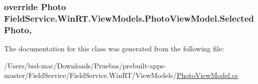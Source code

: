 \hypertarget{class_field_service_1_1_win_r_t_1_1_view_models_1_1_photo_view_model_a7da5a8139584ddbeadc08df3005b5a30}{
\subsubsection[{Selected\+Photo}]{\setlength{\rightskip}{0pt plus 5cm}override {\bf Photo} Field\+Service.\+Win\+R\+T.\+View\+Models.\+Photo\+View\+Model.\+Selected\+Photo\hspace{0.3cm}{\ttfamily [get]}, {\ttfamily [set]}}}\label{class_field_service_1_1_win_r_t_1_1_view_models_1_1_photo_view_model_a7da5a8139584ddbeadc08df3005b5a30}


The documentation for this class was generated from the following file\+:\begin{DoxyCompactItemize}
\item 
/\+Users/bsd-\/mac/\+Downloads/\+Pruebas/prebuilt-\/apps-\/master/\+Field\+Service/\+Field\+Service.\+Win\+R\+T/\+View\+Models/\hyperlink{_win_r_t_2_view_models_2_photo_view_model_8cs}{Photo\+View\+Model.\+cs}\end{DoxyCompactItemize}
